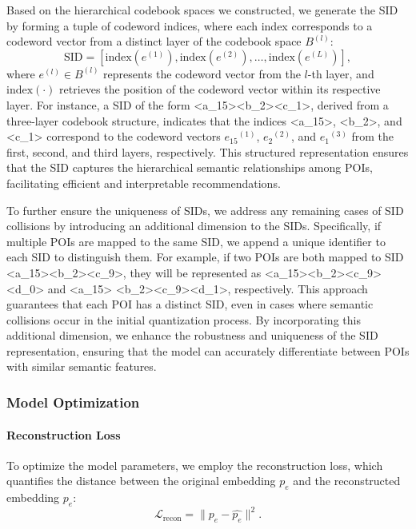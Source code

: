 Based on the hierarchical codebook spaces we constructed, we generate the SID by forming a tuple of codeword indices, where each index corresponds to a codeword vector from a distinct layer of the codebook space $B^{(l)}$:
\begin{equation}\label{equ:build-sid}
\text{SID} = [\text{index}({e}^{(1)}), \text{index}({e}^{(2)}), \dots, \text{index}({e}^{(L)})],
\end{equation}
where ${e}^{(l)} \in B^{(l)}$ represents the codeword vector from the $l$-th layer, and $\text{index}(\cdot)$ retrieves the position of the codeword vector within its respective layer. 
For instance, a SID of the form <a\_15><b\_2><c\_1>, derived from a three-layer codebook structure,   indicates that the indices <a\_15>, <b\_2>, and <c\_1> correspond to the codeword vectors ${e_{15}}^{(1)}$, ${e_2}^{(2)}$, and ${e_1}^{(3)}$ from the first, second, and third layers, respectively. 
This structured representation ensures that the SID captures the hierarchical semantic relationships among POIs, facilitating efficient and interpretable recommendations.

To further ensure the uniqueness of SIDs, we address any remaining cases of SID collisions by introducing an additional dimension to the SIDs. 
Specifically, if multiple POIs are mapped to the same SID, we append a unique identifier to each SID to distinguish them. 
For example, if two POIs are both mapped to SID <a\_15><b\_2><c\_9>, they will be represented as <a\_15><b\_2><c\_9><d\_0> and <a\_15> <b\_2><c\_9><d\_1>, respectively. 
This approach guarantees that each POI has a distinct SID, even in cases where semantic collisions occur in the initial quantization process. 
By incorporating this additional dimension, we enhance the robustness and uniqueness of the SID representation, ensuring that the model can accurately differentiate between POIs with similar semantic features.

\subsubsection{Model Optimization}

\paragraph{Reconstruction Loss}

To optimize the model parameters, we employ the reconstruction loss, which quantifies the distance between the original embedding ${p_e}$ and the reconstructed embedding $\hat{p_e}$:
\begin{equation}\label{equ:reconstruction-loss}
\mathcal{L}_{\text{recon}} = \| p_e - \hat{p_e} \|^2 .
\end{equation}

